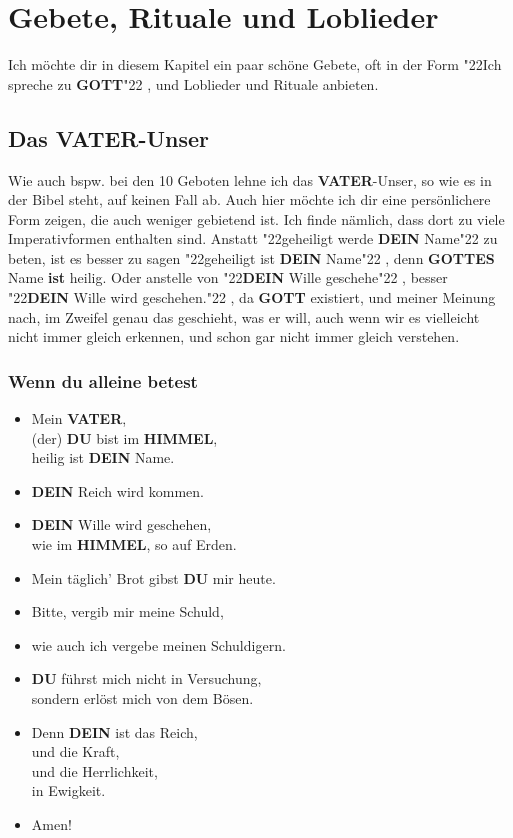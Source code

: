 \documentclass[12pt,a5paper]{article}
\newcommand{\Dein}[0]{\textbf{DEIN}}
\newcommand{\Du}[0]{\textbf{DU}}
\newcommand{\Gottes}[0]{\textbf{GOTTES}}
\newcommand{\Gott}[0]{\textbf{GOTT}}
\newcommand{\Himmel}[0]{\textbf{HIMMEL}}
\newcommand{\Vater}[0]{\textbf{VATER}}
\newcommand{\q}[1]{\char"22{#1}\char"22 }
\begin{document}
	\newpage
	\section{Gebete, Rituale und Loblieder}
		Ich m\"ochte dir in diesem Kapitel ein paar sch\"one Gebete,
		oft in der Form \q{Ich spreche zu {\Gott}},
		und Loblieder und Rituale anbieten.
	
	\subsection{Das {\Vater}-Unser}
		Wie auch bspw. bei den 10 Geboten lehne ich das {\Vater}-Unser,
		so wie es in der Bibel steht,
		auf keinen Fall ab.
		Auch hier m\"ochte ich dir eine pers\"onlichere Form zeigen,
		die auch weniger gebietend ist.
		Ich finde n\"amlich,
		dass dort zu viele Imperativformen enthalten sind.
		Anstatt \q{geheiligt werde {\Dein} Name} zu beten,
		ist es besser zu sagen \q{geheiligt ist {\Dein} Name},
		denn {\Gottes} Name \textbf{ist} heilig.
		Oder anstelle von \q{{\Dein} Wille geschehe},
		besser \q{{\Dein} Wille wird geschehen.},
		da {\Gott} existiert,
		und meiner Meinung nach,
		im Zweifel genau das geschieht,
		was er will,
		auch wenn wir es vielleicht nicht immer gleich erkennen,
		und schon gar nicht immer gleich verstehen.
	
	\subsubsection{Wenn du alleine betest}
		\begin{itemize}[nosep]
			\item	Mein {\Vater},
			\\		(der) {\Du} bist im {\Himmel},
			\\		heilig ist {\Dein} Name.
			\item	{\Dein} Reich wird kommen.
			\item	{\Dein} Wille wird geschehen,
			\\		wie im {\Himmel},
					so auf Erden.
			\item	Mein t\"aglich' Brot gibst {\Du} mir heute.
			\item	Bitte,
					vergib mir meine Schuld,
			\item	wie auch ich vergebe meinen Schuldigern.
			\item	{\Du} f\"uhrst mich nicht in Versuchung,
			\\		sondern erl\"ost mich von dem B\"osen.
			\item	Denn {\Dein} ist das Reich,
			\\		und die Kraft,
			\\		und die Herrlichkeit,
			\\		in Ewigkeit.
			\item	Amen!
		\end{itemize}
			
\end{document}
